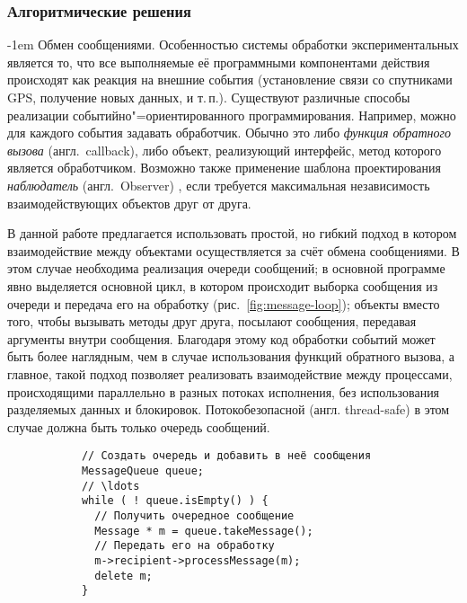 \documentclass[a4paper, 14pt, titlepage]{extarticle}
\makeatletter
\newcommand{\eng}[1]{\foreignlanguage{english}{#1}}
\newcommand{\term}[1]{\emph{#1}}
\newenvironment{myfigure}[2]%
    {\pushQED{\caption{#1} \label{#2}} %
     \begin{figure}[!htb]\centering } %
    {  \popQED %
     \end{figure}}
\renewcommand{\paragraph}{%
    \@startsection{paragraph}{4}%
    {\parindent}{\z@}{-1em}%
    {\normalfont\normalsize\bfseries}%
  }
\makeatother
\begin{document}
  \subsubsection{Алгоритмические решения}
  \paragraph{Обмен сообщениями.}
  Особенностью системы обработки экспериментальных является то, что все выполняемые её программными
  компонентами действия происходят как реакция на внешние события (установление связи со
  спутниками GPS, получение новых данных, и т.\,п.). Существуют различные способы реализации
  событийно"=ориентированного программирования. Например, можно для каждого события задавать
  обработчик. Обычно это либо \term{функция обратного вызова} (англ.~\eng{callback}), либо объект,
  реализующий интерфейс, метод которого является обработчиком. Возможно также применение шаблона
  проектирования \term{наблюдатель} (англ.~\eng{Observer}) \cite{gamma-patterns}, если требуется
  максимальная независимость взаимодействующих объектов друг от друга.

  В данной работе предлагается использовать простой, но гибкий подход в котором взаимодействие между
  объектами осуществляется за счёт обмена сообщениями. В этом случае необходима реализация очереди
  сообщений; в основной программе явно выделяется основной цикл, в котором происходит выборка
  сообщения из очереди и передача его на обработку (рис.~\ref{fig:message-loop}); объекты вместо
  того, чтобы вызывать методы друг друга, посылают сообщения, передавая аргументы внутри сообщения.
  Благодаря этому код обработки событий может быть более наглядным, чем в случае использования
  функций обратного вызова, а главное, такой подход позволяет реализовать взаимодействие между
  процессами, происходящими параллельно в разных потоках исполнения, без использования разделяемых
  данных и блокировок. Потокобезопасной (англ. \eng{thread-safe}) в этом случае должна быть только
  очередь сообщений.

  \begin{myfigure}{Примерный вид основного цикла}{fig:message-loop}
    \begin{lstlisting}
      // Создать очередь и добавить в неё сообщения
      MessageQueue queue;
      // \ldots
      while ( ! queue.isEmpty() ) {
        // Получить очередное сообщение
        Message * m = queue.takeMessage();
        // Передать его на обработку
        m->recipient->processMessage(m);
        delete m;
      }
    \end{lstlisting}
  \end{myfigure}
\end{document}
